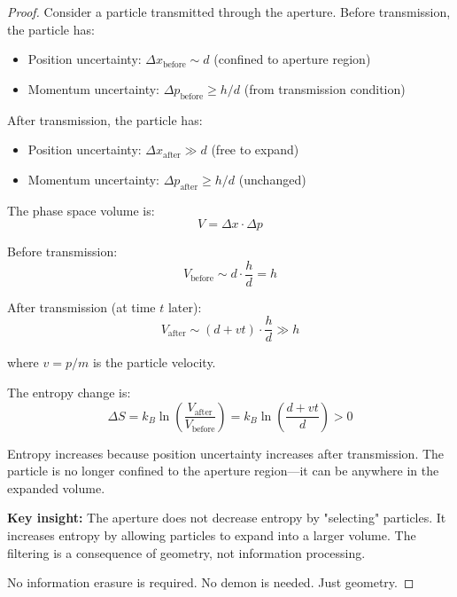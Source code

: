 \begin{proof}
Consider a particle transmitted through the aperture. Before transmission, the particle has:
\begin{itemize}
    \item Position uncertainty: $\Delta x_{\text{before}} \sim d$ (confined to aperture region)
    \item Momentum uncertainty: $\Delta p_{\text{before}} \geq h/d$ (from transmission condition)
\end{itemize}

After transmission, the particle has:
\begin{itemize}
    \item Position uncertainty: $\Delta x_{\text{after}} \gg d$ (free to expand)
    \item Momentum uncertainty: $\Delta p_{\text{after}} \geq h/d$ (unchanged)
\end{itemize}

The phase space volume is:
\begin{equation}
V = \Delta x \cdot \Delta p
\end{equation}

Before transmission:
\begin{equation}
V_{\text{before}} \sim d \cdot \frac{h}{d} = h
\end{equation}

After transmission (at time $t$ later):
\begin{equation}
V_{\text{after}} \sim (d + vt) \cdot \frac{h}{d} \gg h
\end{equation}

where $v = p/m$ is the particle velocity.

The entropy change is:
\begin{equation}
\Delta S = k_B \ln\left(\frac{V_{\text{after}}}{V_{\text{before}}}\right) = k_B \ln\left(\frac{d + vt}{d}\right) > 0
\end{equation}

Entropy increases because position uncertainty increases after transmission. The particle is no longer confined to the aperture region—it can be anywhere in the expanded volume.

\textbf{Key insight:} The aperture does not decrease entropy by "selecting" particles. It increases entropy by allowing particles to expand into a larger volume. The filtering is a consequence of geometry, not information processing.

No information erasure is required. No demon is needed. Just geometry.
\end{proof}

